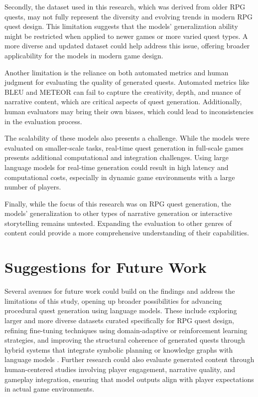 Secondly, the dataset used in this research, which was derived from older RPG quests,
may not fully represent the diversity and evolving trends in modern RPG quest design.
This limitation suggests that the models' generalization ability might be restricted when
applied to newer games or more varied quest types. A more diverse and updated dataset
could help address this issue, offering broader applicability for the models in modern game
design.

Another limitation is the reliance on both automated metrics and human judgment for
evaluating the quality of generated quests. Automated metrics like BLEU and METEOR
can fail to capture the creativity, depth, and nuance of narrative content, which are critical
aspects of quest generation. Additionally, human evaluators may bring their own biases,
which could lead to inconsistencies in the evaluation process.

The scalability of these models also presents a challenge. While the models were
evaluated on smaller-scale tasks, real-time quest generation in full-scale games presents
additional computational and integration challenges. Using large language models for
real-time generation could result in high latency and computational costs, especially in
dynamic game environments with a large number of players.

Finally, while the focus of this research was on RPG quest generation, the models'
generalization to other types of narrative generation or interactive storytelling remains
untested. Expanding the evaluation to other genres of content could provide a more
comprehensive understanding of their capabilities.

\section{Suggestions for Future Work}

Several avenues for future work could build on the findings and address the limitations
of this study, opening up broader possibilities for advancing procedural quest generation
using language models. These include exploring larger and more diverse datasets curated
specifically for RPG quest design, refining fine-tuning techniques using domain-adaptive
or reinforcement learning strategies, and improving the structural coherence of generated
quests through hybrid systems that integrate symbolic planning or knowledge graphs with
language models \cite{ashby2023personalized}. Further research could also evaluate generated content through
human-centered studies involving player engagement, narrative quality, and gameplay
integration, ensuring that model outputs align with player expectations in actual game
environments.

